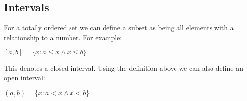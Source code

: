 
\subsection{Intervals}

For a totally ordered set we can define a subset as being all elements with a relationship to a number. For example:

\([a,b]=\{x:a\le x \land x\le b\}\)

This denotes a closed interval. Using the definition above we can also define an open interval:

\((a,b)=\{x:a< x \land x< b\}\)


